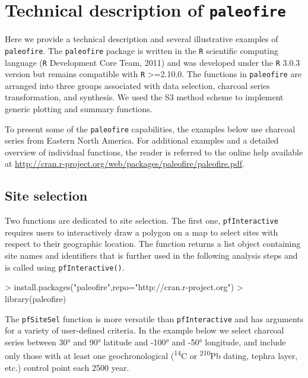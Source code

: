 \documentclass{elsarticle}
\begin{document}
\section{Technical description of \texttt{paleofire}}

Here we provide a technical description and several illustrative examples of \texttt{paleofire}. The \texttt{paleofire} package is written in the \texttt{R} scientific computing language (\texttt{R} Development Core Team, 2011) and was developed under the \texttt{R} 3.0.3 version but remains compatible with \texttt{R} >=2.10.0. The functions in \texttt{paleofire} are arranged into three groups associated with data selection, charcoal series transformation, and synthesis. We used the S3 method scheme to implement generic plotting and summary functions.

To present some of the \texttt{paleofire} capabilities, the examples below use charcoal series from Eastern North America. For additional examples and a detailed overview of individual functions, the reader is referred to the online help available at \url{http://cran.r-project.org/web/packages/paleofire/paleofire.pdf}.

\subsection{Site selection}

Two functions are dedicated to site selection. The first one, \texttt{pfInteractive} requires users to interactively draw a polygon on a map to select sites with respect to their geographic location. The function returns a list object containing site names and identifiers that is further used in the following analysis steps and is called using \texttt{pfInteractive()}.


\begin{Schunk}
\begin{Sinput}
> install.packages("paleofire",repo="http://cran.r-project.org")
> library(paleofire)
\end{Sinput}
\end{Schunk}


The \texttt{pfSiteSel} function is more versatile than \texttt{pfInteractive} and has arguments for a variety of user-defined criteria. In the example below we select charcoal series between 30° and 90° latitude and -100° and -50° longitude, and include only those with at least one geochronological (\textsuperscript{14}C or \textsuperscript{210}Pb dating, tephra layer, etc.) control point each 2500 year. 
\end{document}

